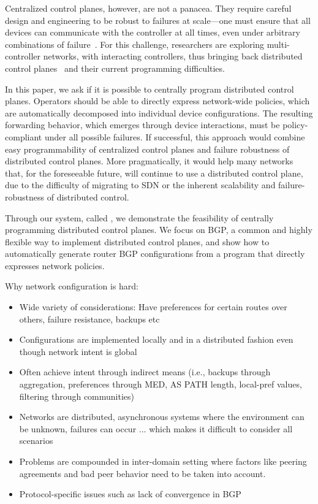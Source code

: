 Centralized control planes, however, are not a panacea. 
They require careful design and engineering to be robust to failures at scale---one must ensure that all devices can communicate with the controller at all times, even under arbitrary combinations of failure~\cite{x,y,z}. For this challenge, researchers are exploring multi-controller networks, with interacting controllers, thus bringing back distributed control planes~\cite{x,y,z} and their current programming difficulties.

In this paper, we ask if it is possible to centrally program distributed control planes.
Operators should be able to directly express network-wide policies, which are automatically decomposed into individual device configurations. The resulting forwarding behavior, which emerges through device interactions, must be policy-compliant under all possible failures.
If successful, this approach would combine easy programmability of centralized control planes and failure robustness of distributed control planes. 
%
More pragmatically, it would help many networks that, for the foreseeable future, will continue to use a distributed control plane, due to the difficulty of migrating to SDN or the inherent scalability and failure-robustness of distributed control.


Through our system, called \sysname, we demonstrate the feasibility of centrally programming distributed control planes. We focus on BGP, a common and highly flexible way to implement distributed control planes, and show how to automatically generate router BGP configurations from a program that directly expresses network policies.



Why network configuration is hard:
\begin{itemize}
	\item Wide variety of considerations: Have preferences for certain routes over others, failure resistance, backups etc
	\item Configurations are implemented locally and in a distributed fashion even though network intent is global
	\item Often achieve intent through indirect means (i.e., backups through aggregation, preferences through MED, AS PATH length, local-pref values, filtering through communities)
	\item Networks are distributed, asynchronous systems where the environment can be unknown, failures can occur ... which makes it difficult to consider all scenarios
	\item Problems are compounded in inter-domain setting where factors like peering agreements and bad peer behavior need to be taken into account.
	\item Protocol-specific issues such as lack of convergence in BGP
\end{itemize}

